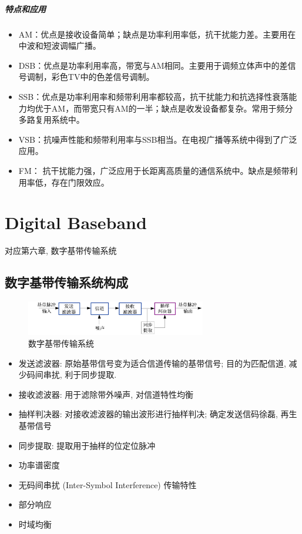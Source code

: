 \documentclass[a4paper]{report}
\begin{document}
\paragraph{特点和应用}
\begin{itemize}
  \item AM：优点是接收设备简单；缺点是功率利用率低，抗干扰能力差。主要用在中波和短波调幅广播。
  \item DSB：优点是功率利用率高，带宽与AM相同。主要用于调频立体声中的差信号调制，彩色TV中的色差信号调制。
  \item SSB：优点是功率利用率和频带利用率都较高，抗干扰能力和抗选择性衰落能力均优于AM，而带宽只有AM的一半；缺点是收发设备都复杂。常用于频分多路复用系统中。
  \item VSB：抗噪声性能和频带利用率与SSB相当。在电视广播等系统中得到了广泛应用。
  \item FM： 抗干扰能力强，广泛应用于长距离高质量的通信系统中。缺点是频带利用率低，存在门限效应。
\end{itemize}
\chapter{Digital Baseband}
对应第六章, 数字基带传输系统
\section{数字基带传输系统构成}
\begin{figure}[H]
\centering
\includegraphics[width=0.7\textwidth]{baseband_system.png}
\caption{数字基带传输系统}
\end{figure}
\begin{itemize}
  \item 发送滤波器: 原始基带信号变为适合信道传输的基带信号; 目的为匹配信道, 减少码间串扰, 利于同步提取.
  \item 接收滤波器: 用于滤除带外噪声, 对信道特性均衡
  \item 抽样判决器: 对接收滤波器的输出波形进行抽样判决; 确定发送信码徐磊, 再生基带信号
  \item 同步提取: 提取用于抽样的位定位脉冲
\end{itemize}

\begin{itemize}
  \item 功率谱密度
  \item 无码间串扰 (Inter-Symbol Interference) 传输特性
  \item 部分响应
  \item 时域均衡
\end{itemize}
\end{document}
